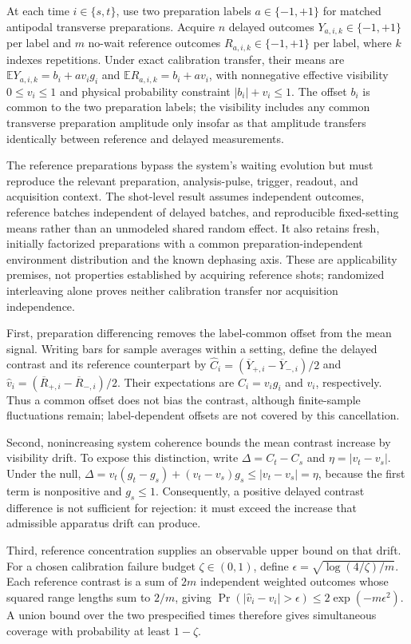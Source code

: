 \documentclass[11pt]{article}
\begin{document}
At each time $i\in\{s,t\}$, use two preparation labels $a\in\{-1,+1\}$ for matched antipodal transverse preparations. Acquire $n$ delayed outcomes $Y_{a,i,k}\in\{-1,+1\}$ per label and $m$ no-wait reference outcomes $R_{a,i,k}\in\{-1,+1\}$ per label, where $k$ indexes repetitions. Under exact calibration transfer, their means are $\mathbb E Y_{a,i,k}=b_i+a v_i g_i$ and $\mathbb E R_{a,i,k}=b_i+a v_i$, with nonnegative effective visibility $0\leq v_i\leq1$ and physical probability constraint $|b_i|+v_i\leq1$. The offset $b_i$ is common to the two preparation labels; the visibility includes any common transverse preparation amplitude only insofar as that amplitude transfers identically between reference and delayed measurements.

The reference preparations bypass the system\textquoteright{}s waiting evolution but must reproduce the relevant preparation, analysis-pulse, trigger, readout, and acquisition context. The shot-level result assumes independent outcomes, reference batches independent of delayed batches, and reproducible fixed-setting means rather than an unmodeled shared random effect. It also retains fresh, initially factorized preparations with a common preparation-independent environment distribution and the known dephasing axis. These are applicability premises, not properties established by acquiring reference shots; randomized interleaving alone proves neither calibration transfer nor acquisition independence.

First, preparation differencing removes the label-common offset from the mean signal. Writing bars for sample averages within a setting, define the delayed contrast and its reference counterpart by $\widehat C_i=(\overline Y_{+,i}-\overline Y_{-,i})/2$ and $\widehat v_i=(\overline R_{+,i}-\overline R_{-,i})/2$. Their expectations are $C_i=v_i g_i$ and $v_i$, respectively. Thus a common offset does not bias the contrast, although finite-sample fluctuations remain; label-dependent offsets are not covered by this cancellation.

Second, nonincreasing system coherence bounds the mean contrast increase by visibility drift. To expose this distinction, write $\Delta=C_t-C_s$ and $\eta=|v_t-v_s|$. Under the null, $\Delta=v_t(g_t-g_s)+(v_t-v_s)g_s\leq|v_t-v_s|=\eta$, because the first term is nonpositive and $g_s\leq1$. Consequently, a positive delayed contrast difference is not sufficient for rejection: it must exceed the increase that admissible apparatus drift can produce.

Third, reference concentration supplies an observable upper bound on that drift. For a chosen calibration failure budget $\zeta\in(0,1)$, define $\epsilon=\sqrt{\log(4/\zeta)/m}$. Each reference contrast is a sum of $2m$ independent weighted outcomes whose squared range lengths sum to $2/m$, giving $\Pr(|\widehat v_i-v_i|>\epsilon)\leq2\exp(-m\epsilon^2)$. A union bound over the two prespecified times therefore gives simultaneous coverage with probability at least $1-\zeta$.
\end{document}
